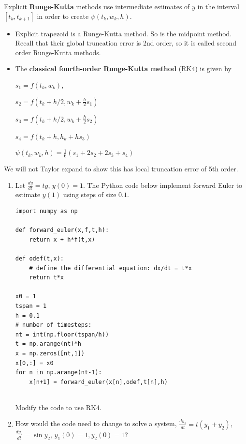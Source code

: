 \documentclass[12pt,letterpaper,noanswers]{exam}
\begin{document}
\begin{tcolorbox}
Explicit \textbf{Runge-Kutta} methods use intermediate estimates of $y$ in the interval $[t_k,t_{k+1}]$ in order to create $\psi(t_k,w_k,h)$.  
\begin{itemize}
\itemsep0pt
    \item Explicit trapezoid is a Runge-Kutta method.  So is the midpoint method.  Recall that their global truncation error is 2nd order, so it is called second order Runge-Kutta methods.
    \item The \textbf{classical fourth-order Runge-Kutta method} (RK4) is given by 
    
    $s_1 = f(t_k,w_k)$, 
    
    $s_2 = f(t_k+h/2,w_k+\frac{h}{2}s_1)$
    
    $s_3 = f(t_k + h/2,w_k + \frac{h}{2}s_2)$
    
    $s_4 = f(t_k+h, h_k + hs_3)$
    
    $\psi(t_k,w_k,h) = \frac{1}{6}(s_1+2s_2+2s_3+s_4)$
\end{itemize}

We will not Taylor expand to show this has local truncation error of 5th order.
\end{tcolorbox}
\begin{enumerate}[resume]
\item Let $\frac{dy}{dt} = ty$, $y(0) = 1$.  The Python code below implement forward Euler to estimate $y(1)$ using steps of size $0.1$.

\begin{lstlisting}
import numpy as np

def forward_euler(x,f,t,h):
    return x + h*f(t,x)

def odef(t,x):
    # define the differential equation: dx/dt = t*x
    return t*x

x0 = 1
tspan = 1
h = 0.1
# number of timesteps:
nt = int(np.floor(tspan/h))
t = np.arange(nt)*h
x = np.zeros([nt,1])
x[0,:] = x0
for n in np.arange(nt-1):
    x[n+1] = forward_euler(x[n],odef,t[n],h)
    
\end{lstlisting}

Modify the code to use RK4.


\vspace{1in}

\item How would the code need to change to solve a system, $\frac{dy_1}{dt} = t(y_1+y_2)$, $\frac{dy_2}{dt} = \sin y_2$, $y_1(0) = 1, y_2(0) = 1$?
\end{enumerate}
\end{document}
